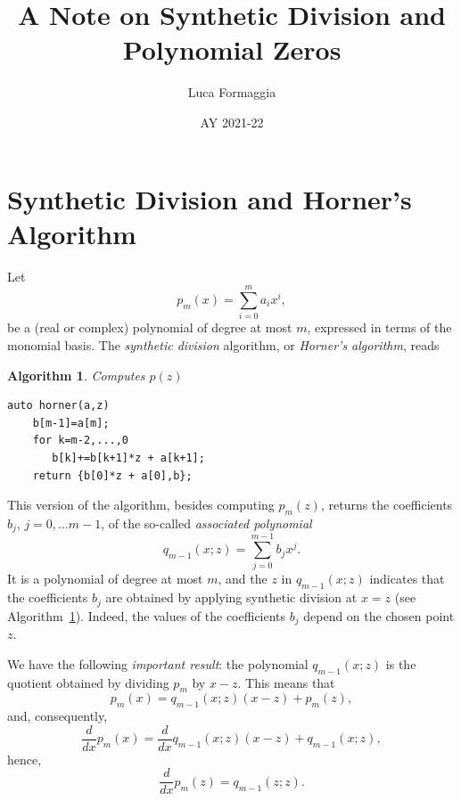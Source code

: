 \documentclass[10pt,a4paper]{article}
\author{Luca Formaggia}
\date{AY 2021-22}
\title{A Note on Synthetic Division and Polynomial Zeros}
\theoremstyle{definition}%
\newtheorem{algo}{Algorithm}
\begin{document}
 
 \maketitle
 \section{Synthetic Division and Horner's Algorithm}
 Let
 \[
 p_m(x)=\sum_{i=0}^{m} a_i x^i,
 \]
be a (real or complex) polynomial of degree at most $m$, expressed in terms of the monomial basis.
  The \emph{synthetic division} algorithm, or \emph{Horner's algorithm}, reads

\begin{algo}\label{alg:horner}
\emph{Computes $p(z)$}
\begin{lstlisting}
auto horner(a,z)
    b[m-1]=a[m];
    for k=m-2,...,0 
	   b[k]+=b[k+1]*z + a[k+1]; 
    return {b[0]*z + a[0],b}; 
\end{lstlisting}
\end{algo}
This version of the algorithm, besides computing $p_m(z)$,
  returns the coefficients $b_j$, $j=0,\ldots m-1$, of the so-called \emph{associated polynomial}
\begin{equation}
\label{eq:associated}
q_{m-1}(x;z)=\sum_{j=0}^{m-1}b_j x^j.
\end{equation}
It is a polynomial of degree at most $m$, and the $z$ in $q_{m-1}(x;z)$ indicates
  that the coefficients $b_j$ are obtained by applying synthetic division at $x=z$ (see Algorithm~\ref{alg:horner}). Indeed, the values of the coefficients $b_j$ depend on the chosen point $z$.

We have the following \emph{important result}: the polynomial $q_{m-1}(x;z)$ is the quotient
  obtained by dividing $p_m$ by $x-z$. This means that
\begin{equation}
\label{eq:quotient}
\boxed{p_m(x)=q_{m-1}(x;z)(x-z) + p_m(z),}
\end{equation}
and, consequently,
\begin{equation}
\label{eq:quotientder}
\boxed{\frac{d}{dx}p_m(x)=\frac{d}{dx}q_{m-1}(x;z)(x-z) + q_{m-1}(x;z),}
\end{equation}
hence,
\begin{equation}
\label{eq:quotientdertwo}
\boxed{\frac{d}{dx}p_m(z)=q_{m-1}(z;z).}
\end{equation}
\end{document}
